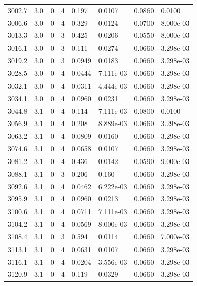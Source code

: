 \documentclass[preview]{standalone}
\begin{document}
{{{{{{{{{{{{{{\begin{tabular}{L{1.2cm}C{1.2cm} C{0.3cm}C{0.5cm} C{1.4cm}C{1.4cm} C{1.4cm}C{1.4cm}}
  3002.7  &   3.0  & 0     &  4 &  0.197  & 0.0107  & 0.0860 &  0.0100   \\ 
  3006.6  &   3.0  & 0     &  4 &  0.329  & 0.0124  & 0.0700 &  8.000e-03   \\ 
  3013.3  &   3.0  & 0     &  3 &  0.425  & 0.0206  & 0.0550 &  8.000e-03   \\ 
  3016.1  &   3.0  & 0     &  3 &  0.111  & 0.0274  & 0.0660 &  3.298e-03   \\ 
  3019.2  &   3.0  & 0     &  3 &  0.0949  & 0.0183  & 0.0660 &  3.298e-03   \\ 
  3028.5  &   3.0  & 0     &  4 &  0.0444  & 7.111e-03  & 0.0660 &  3.298e-03   \\ 
  3032.1  &   3.0  & 0     &  4 &  0.0311  & 4.444e-03  & 0.0660 &  3.298e-03   \\ 
  3034.1  &   3.0  & 0     &  4 &  0.0960  & 0.0231  & 0.0660 &  3.298e-03   \\ 
  3044.8  &   3.1  & 0     &  4 &  0.114  & 7.111e-03  & 0.0800 &  0.0100   \\ 
  3056.9  &   3.1  & 0     &  4 &  0.208  & 8.889e-03  & 0.0660 &  3.298e-03   \\ 
  3063.2  &   3.1  & 0     &  4 &  0.0809  & 0.0160  & 0.0660 &  3.298e-03   \\ 
  3074.6  &   3.1  & 0     &  4 &  0.0658  & 0.0107  & 0.0660 &  3.298e-03   \\ 
  3081.2  &   3.1  & 0     &  4 &  0.436  & 0.0142  & 0.0590 &  9.000e-03   \\ 
  3088.1  &   3.1  & 0     &  3 &  0.206  & 0.160  & 0.0660 &  3.298e-03   \\ 
  3092.6  &   3.1  & 0     &  4 &  0.0462  & 6.222e-03  & 0.0660 &  3.298e-03   \\ 
  3095.9  &   3.1  & 0     &  4 &  0.0960  & 0.0213  & 0.0660 &  3.298e-03   \\ 
  3100.6  &   3.1  & 0     &  4 &  0.0711  & 7.111e-03  & 0.0660 &  3.298e-03   \\ 
  3104.2  &   3.1  & 0     &  4 &  0.0569  & 8.000e-03  & 0.0660 &  3.298e-03   \\ 
  3108.4  &   3.1  & 0     &  3 &  0.594  & 0.0114  & 0.0660 &  7.000e-03   \\ 
  3113.1  &   3.1  & 0     &  4 &  0.0631  & 0.0107  & 0.0660 &  3.298e-03   \\ 
  3116.1  &   3.1  & 0     &  4 &  0.0204  & 3.556e-03  & 0.0660 &  3.298e-03   \\ 
  3120.9  &   3.1  & 0     &  4 &  0.119  & 0.0329  & 0.0660 &  3.298e-03   \\ 

\end{tabular}}}}}}}}}}}}}}}
\end{document}

